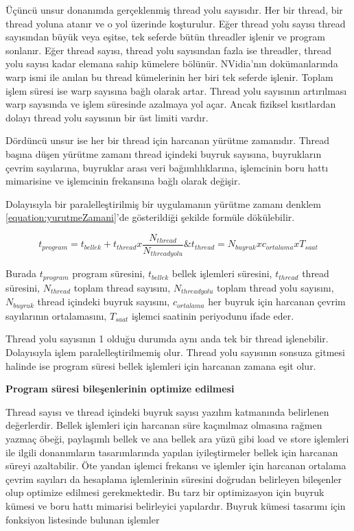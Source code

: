 Üçüncü unsur donanımda gerçeklenmiş thread yolu sayısıdır. Her bir thread, bir thread yoluna atanır ve o yol üzerinde koşturulur. Eğer thread yolu sayısı thread sayısından büyük veya eşitse, tek seferde bütün threadler işlenir ve program sonlanır. Eğer thread sayısı, thread yolu sayısından fazla ise threadler, thread yolu sayısı kadar elemana sahip kümelere bölünür. NVidia'nın dokümanlarında warp ismi ile anılan bu thread kümelerinin her biri tek seferde işlenir. Toplam işlem süresi ise warp sayısına bağlı olarak artar. Thread yolu sayısının artırılması warp sayısında ve işlem süresinde azalmaya yol açar. Ancak fiziksel kısıtlardan dolayı thread yolu sayısının bir üst limiti vardır. \par

Dördüncü unsur ise her bir thread için harcanan yürütme zamanıdır. Thread başına düşen yürütme zamanı thread içindeki buyruk sayısına, buyrukların çevrim sayılarına, buyruklar arası veri bağımlılıklarına, işlemcinin boru hattı mimarisine ve işlemcinin frekansına bağlı olarak değişir.\par

Dolayısıyla bir paralelleştirilmiş bir uygulamanın yürütme zamanı denklem \ref{equation:yurutmeZamani}'de gösterildiği şekilde formüle dökülebilir.

\begin{equation} \label{equation:yurutmeZamani}
t_{program} = t_{bellek} + t_{thread} x \frac{N_{thread}}{N_{thread yolu}} \& 
t_{thread} = N_{buyruk} x c_{ortalama} x T_{saat}
\end{equation} 

Burada $t_{program}$ program süresini, $t_{bellek}$ bellek işlemleri süresini, $t_{thread}$ thread süresini, $N_{thread}$ toplam thread sayısını, $N_{thread yolu}$ toplam thread yolu sayısını, $N_{buyruk}$ thread içindeki buyruk sayısını, $c_{ortalama}$ her buyruk için harcanan çevrim sayılarının ortalamasını, $T_{saat}$ işlemci saatinin periyodunu ifade eder.\par

Thread yolu sayısının 1 olduğu durumda aynı anda tek bir thread işlenebilir. Dolayısıyla işlem paralelleştirilmemiş olur. Thread yolu sayısının sonsuza gitmesi halinde ise program süresi bellek işlemleri için harcanan zamana eşit olur. \par
\textbf{Program süresi bileşenlerinin optimize edilmesi}\par
Thread sayısı ve thread içindeki buyruk sayısı yazılım katmanında belirlenen değerlerdir. Bellek işlemleri için harcanan süre kaçınılmaz olmasına rağmen yazmaç öbeği, paylaşımlı bellek ve ana bellek ara yüzü gibi load ve store işlemleri ile ilgili donanımların tasarımlarında yapılan iyileştirmeler bellek için harcanan süreyi azaltabilir. Öte yandan işlemci frekansı ve işlemler için harcanan ortalama çevrim sayıları da hesaplama işlemlerinin süresini doğrudan belirleyen bileşenler olup optimize edilmesi gerekmektedir. Bu tarz bir optimizasyon için buyruk kümesi ve boru hattı mimarisi belirleyici yapılardır. Buyruk kümesi tasarımı için fonksiyon listesinde bulunan işlemler \par 
